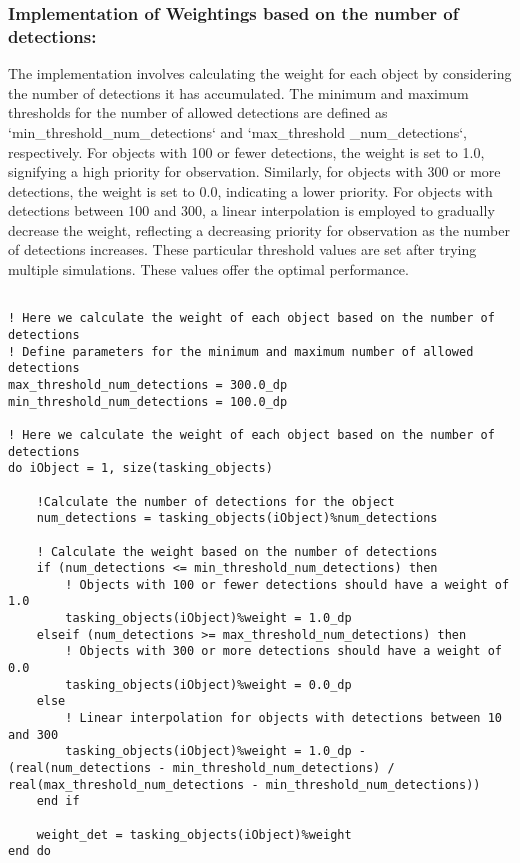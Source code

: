 \subsubsection{Implementation of Weightings based on the number of detections:}
The implementation involves calculating the weight for each object by considering the number of detections it has accumulated. The minimum and maximum thresholds for the number of allowed detections are defined as `min\_threshold\_num\_detections` and `max\_threshold \_num\_detections`, respectively. For objects with 100 or fewer detections, the weight is set to 1.0, signifying a high priority for observation. Similarly, for objects with 300 or more detections, the weight is set to 0.0, indicating a lower priority. For objects with detections between 100 and 300, a linear interpolation is employed to gradually decrease the weight, reflecting a decreasing priority for observation as the number of detections increases. These particular threshold values are set after trying multiple simulations. These values offer the optimal performance. \\

\begin{lstlisting}

! Here we calculate the weight of each object based on the number of detections
! Define parameters for the minimum and maximum number of allowed detections
max_threshold_num_detections = 300.0_dp
min_threshold_num_detections = 100.0_dp

! Here we calculate the weight of each object based on the number of detections
do iObject = 1, size(tasking_objects)

	!Calculate the number of detections for the object
	num_detections = tasking_objects(iObject)%num_detections

	! Calculate the weight based on the number of detections
	if (num_detections <= min_threshold_num_detections) then
		! Objects with 100 or fewer detections should have a weight of 1.0
		tasking_objects(iObject)%weight = 1.0_dp
	elseif (num_detections >= max_threshold_num_detections) then
		! Objects with 300 or more detections should have a weight of 0.0
		tasking_objects(iObject)%weight = 0.0_dp
	else
		! Linear interpolation for objects with detections between 10 and 300
		tasking_objects(iObject)%weight = 1.0_dp - (real(num_detections - min_threshold_num_detections) /  real(max_threshold_num_detections - min_threshold_num_detections))
	end if

	weight_det = tasking_objects(iObject)%weight      
end do

\end{lstlisting}
